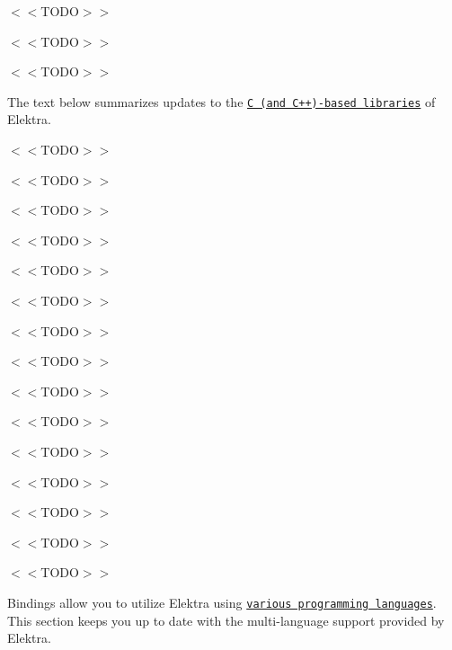 \begin{DoxyItemize}
\item $<$$<$\+T\+O\+D\+O$>$$>$
\item $<$$<$\+T\+O\+D\+O$>$$>$
\item $<$$<$\+T\+O\+D\+O$>$$>$
\end{DoxyItemize}

The text below summarizes updates to the \href{https://www.libelektra.org/libraries/readme}{\tt C (and C++)-\/based libraries} of Elektra.


\begin{DoxyItemize}
\item $<$$<$\+T\+O\+D\+O$>$$>$
\item $<$$<$\+T\+O\+D\+O$>$$>$
\item $<$$<$\+T\+O\+D\+O$>$$>$
\end{DoxyItemize}


\begin{DoxyItemize}
\item $<$$<$\+T\+O\+D\+O$>$$>$
\item $<$$<$\+T\+O\+D\+O$>$$>$
\item $<$$<$\+T\+O\+D\+O$>$$>$
\end{DoxyItemize}


\begin{DoxyItemize}
\item $<$$<$\+T\+O\+D\+O$>$$>$
\item $<$$<$\+T\+O\+D\+O$>$$>$
\item $<$$<$\+T\+O\+D\+O$>$$>$
\end{DoxyItemize}


\begin{DoxyItemize}
\item $<$$<$\+T\+O\+D\+O$>$$>$
\item $<$$<$\+T\+O\+D\+O$>$$>$
\item $<$$<$\+T\+O\+D\+O$>$$>$
\end{DoxyItemize}


\begin{DoxyItemize}
\item $<$$<$\+T\+O\+D\+O$>$$>$
\item $<$$<$\+T\+O\+D\+O$>$$>$
\item $<$$<$\+T\+O\+D\+O$>$$>$
\end{DoxyItemize}

Bindings allow you to utilize Elektra using \href{https://www.libelektra.org/bindings/readme}{\tt various programming languages}. This section keeps you up to date with the multi-\/language support provided by Elektra.


